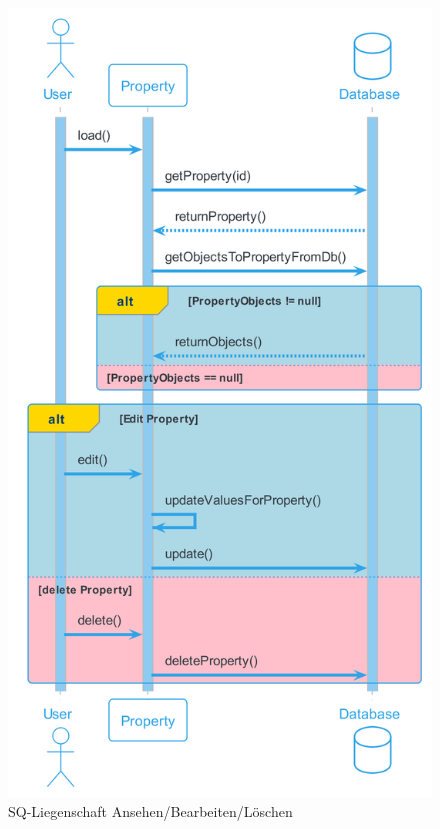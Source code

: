 \begin{figure}[H]
  \begin{center}
    \includegraphics[width=0.55\linewidth]{content/diagrams/out/sequenzdiagram/liegenschaftAnsehenBearbeiten/LiegenschaftAnsehenBearbeiten.png}
    \caption{SQ-Liegenschaft Ansehen/Bearbeiten/Löschen}
    \label{sqOLiegenschatEdit}
  \end{center}
\end{figure}

